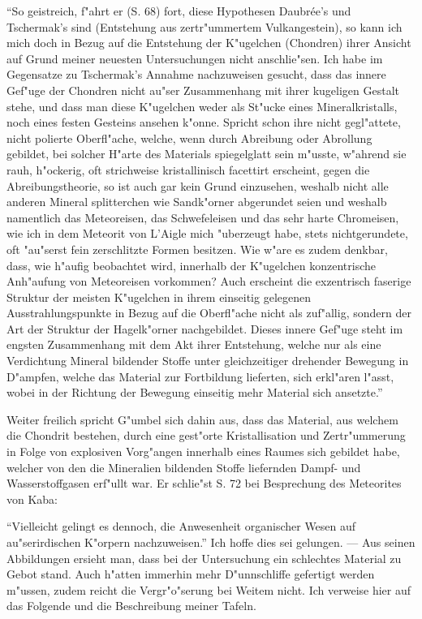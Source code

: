 \documentclass[a4paper, 11pt, oneside]{article}
\begin{document}
"`So geistreich, f"ahrt er (S. 68) fort, diese Hypothesen Daubrée's und Tschermak's sind (Entstehung aus zertr"ummertem Vulkangestein), so kann ich mich doch in Bezug auf die Entstehung der K"ugelchen (Chondren) ihrer Ansicht auf Grund meiner neuesten Untersuchungen nicht anschlie"sen. Ich habe im Gegensatze zu Tschermak's Annahme nachzuweisen gesucht, dass das innere Gef"uge der Chondren nicht au"ser Zusammenhang mit ihrer kugeligen Gestalt stehe, und dass man diese K"ugelchen weder als St"ucke eines Mineralkristalls, noch eines festen Gesteins ansehen k"onne. Spricht schon ihre nicht gegl"attete, nicht polierte Oberfl"ache, welche, wenn durch Abreibung oder Abrollung gebildet, bei solcher H"arte des Materials spiegelglatt sein m"usste, w"ahrend sie rauh, h"ockerig, oft strichweise kristallinisch facettirt erscheint, gegen die Abreibungstheorie, so ist auch gar kein Grund einzusehen, weshalb nicht alle anderen Mineral splitterchen wie Sandk"orner abgerundet seien und weshalb namentlich das Meteoreisen, das Schwefeleisen und das sehr harte Chromeisen, wie ich in dem Meteorit von L'Aigle mich "uberzeugt habe, stets nichtgerundete, oft "au"serst fein zerschlitzte Formen besitzen. Wie w"are es zudem denkbar, dass, wie h"aufig beobachtet wird, innerhalb der K"ugelchen konzentrische Anh"aufung von Meteoreisen vorkommen? Auch erscheint die exzentrisch faserige Struktur der meisten K"ugelchen in ihrem einseitig gelegenen Ausstrahlungspunkte in Bezug auf die Oberfl"ache nicht als zuf"allig, sondern der Art der Struktur der Hagelk"orner nachgebildet. Dieses innere Gef"uge steht im engsten Zusammenhang mit dem Akt ihrer Entstehung, welche nur als eine Verdichtung Mineral bildender Stoffe unter gleichzeitiger drehender Bewegung in D"ampfen, welche das Material zur Fortbildung lieferten, sich erkl"aren l"asst, wobei in der Richtung der Bewegung einseitig mehr Material sich ansetzte."'

Weiter freilich spricht G"umbel sich dahin aus, dass das Material, aus welchem die Chondrit bestehen, durch eine gest"orte Kristallisation und Zertr"ummerung in Folge von explosiven Vorg"angen innerhalb eines Raumes sich gebildet habe, welcher von den die Mineralien bildenden Stoffe liefernden Dampf- und Wasserstoffgasen erf"ullt war. Er schlie"st S. 72 bei Besprechung des Meteorites von Kaba:

"`Vielleicht gelingt es dennoch, die Anwesenheit organischer Wesen auf au"serirdischen K"orpern nachzuweisen."' Ich hoffe dies sei gelungen. --- Aus seinen Abbildungen ersieht man, dass bei der Untersuchung ein schlechtes Material zu Gebot stand. Auch h"atten immerhin mehr D"unnschliffe gefertigt werden m"ussen, zudem reicht die Vergr"o"serung bei Weitem nicht. Ich verweise hier auf das Folgende und die Beschreibung meiner Tafeln.
\end{document}

